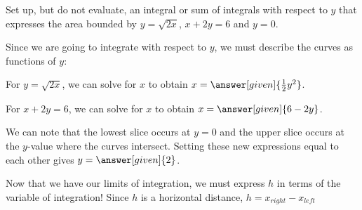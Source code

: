 \documentclass{ximera}
\begin{document}
\begin{example} Set up, but do not evaluate, an integral or sum of integrals with respect to $y$ that expresses the area bounded by $y=\sqrt{2x}$, $x+2y=6$ and $y=0$.

\begin{explanation}

Since we are going to integrate with respect to $y$, we must describe the curves as functions of $y$:

For $y=\sqrt{2x}$, we can solve for $x$ to obtain $x= \answer[given]{\frac{1}{2}y^2}$.

For $x+2y=6$, we can solve for $x$ to obtain $x= \answer[given]{6-2y}$.

We can note that the lowest slice occurs at $y=0$ and the upper slice occurs at the $y$-value where the curves intersect.  Setting these new expressions equal to each other gives $y= \answer[given]{2}$.  

Now that we have our limits of integration, we must express $h$ in terms of the variable of integration!  Since $h$ is a horizontal distance, $h=x_{right}-x_{left}$

  \begin{image}
\end{image}
\end{explanation}
\end{example}
\end{document}
